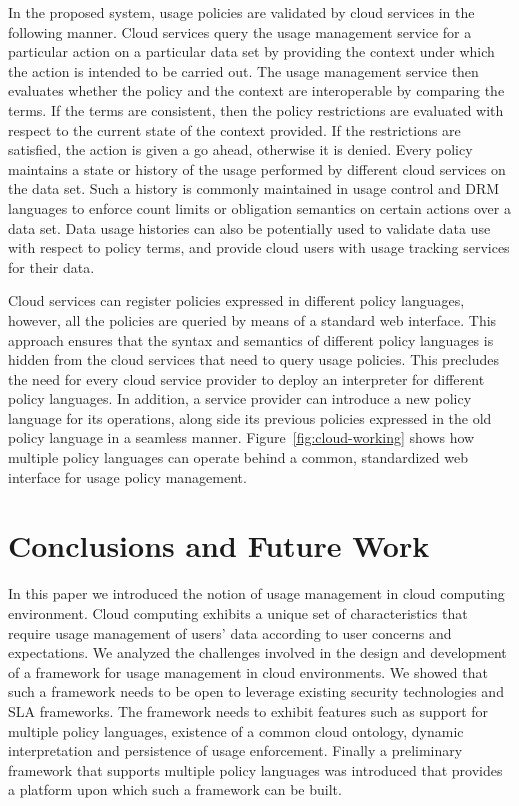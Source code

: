\documentclass[10pt,letterpaper]{book}
\begin{document}
In the proposed system, usage policies are validated by cloud services in the following manner. Cloud services query the usage management service for a particular action on a particular data set by providing the context under which the action is intended to be carried out. The usage management service then evaluates whether the policy and the context are interoperable by comparing the terms. If the terms are consistent, then the policy restrictions are evaluated with respect to the current state of the context provided. If the restrictions are satisfied, the action is given a go ahead, otherwise it is denied. Every policy maintains a state or history of the usage performed by different cloud services on the data set. Such a history is commonly maintained in usage control and DRM languages to enforce count limits or obligation semantics on certain actions over a data set. Data usage histories can also be potentially used to validate data use with respect to policy terms, and provide cloud users with usage tracking services for their data.

Cloud services can register policies expressed in different policy languages,  however, all the policies are queried by means of a standard web interface. This approach ensures that the syntax and semantics of different policy languages is hidden from the cloud services that need to query usage policies. This precludes the need for every cloud service provider to deploy an interpreter for different policy languages. In addition, a service provider can introduce a new policy language for its operations, along side its previous policies expressed in the old policy language in a seamless manner. Figure~\ref{fig:cloud-working} shows how multiple policy languages can operate behind a common, standardized web interface for usage policy management.

\section{Conclusions and Future Work}\label{sec:conclusions}
In this paper we introduced the notion of usage management in cloud computing environment. Cloud computing exhibits a unique set of characteristics that require usage management of users' data according to user concerns and expectations. We analyzed the challenges involved in the design and development of a framework for usage management in cloud environments. We showed that such a framework needs to be open to leverage existing security technologies and SLA frameworks. The framework needs to exhibit features such as support for multiple policy languages, existence of a common cloud ontology, dynamic interpretation and persistence of usage enforcement. Finally a preliminary framework that supports multiple policy languages was introduced that provides a platform upon which such a framework can be built. 
\end{document}
